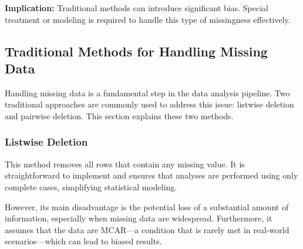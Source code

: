 \documentclass[a4paper,12pt]{article}
\begin{document}
\textbf{Implication:} Traditional methods can introduce significant bias. Special treatment or modeling is required to handle this type of missingness effectively.

\subsection{Traditional Methods for Handling Missing Data}

Handling missing data is a fundamental step in the data analysis pipeline. Two traditional approaches are commonly used to address this issue: listwise deletion and pairwise deletion. This section explains these two methods.

\subsubsection{Listwise Deletion}

This method removes all rows that contain any missing value. It is straightforward to implement and ensures that analyses are performed using only complete cases, simplifying statistical modeling.

However, its main disadvantage is the potential loss of a substantial amount of information, especially when missing data are widespread. Furthermore, it assumes that the data are MCAR—a condition that is rarely met in real-world scenarios—which can lead to biased results. ~\cite{3}
\end{document}

